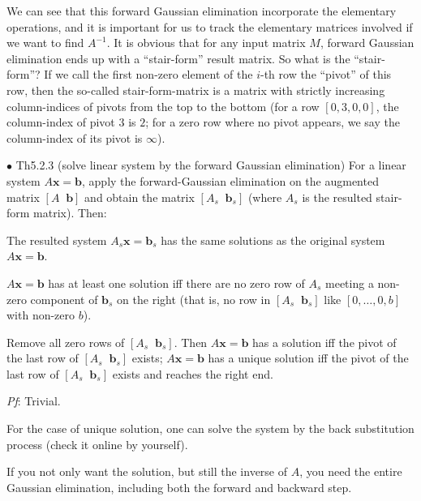 \documentclass{article}
\begin{document}
\begin{Rmk}{}
    We can see that this forward Gaussian elimination incorporate the elementary operations, and it is important for us to track the elementary matrices involved if we want to find $A^{-1}$.
    \textcolor{Th}{It is obvious that for any input matrix $M$, forward Gaussian elimination ends up with a ``stair-form'' result matrix.} So what is the ``stair-form''? \textcolor{Df}{If we call the first non-zero element of the $i$-th row the ``pivot'' of this row, then the so-called stair-form-matrix is a matrix with strictly increasing column-indices of pivots from the top to the bottom (for a row $[0,3,0,0]$, the column-index of pivot $3$ is $2$; for a zero row where no pivot appears, we say the column-index of its pivot is $\infty$).}
\end{Rmk}

\begin{Th}{$\bullet$ Th5.2.3 (solve linear system by the forward Gaussian elimination)}
    For a linear system $A\pmb{x} = \pmb{b}$, apply the forward-Gaussian elimination on the augmented matrix $[A\;\;\pmb{b}]$ and obtain the matrix $[A_s\;\; \pmb{b}_s]$ (where $A_s$ is the resulted stair-form matrix). Then:
    \begin{compactenum}
        \item The resulted system $A_s\pmb{x} = \pmb{b}_s$ has the same solutions as the original system $A\pmb{x} = \pmb{b}$.
        \item $A\pmb{x} = \pmb{b}$ has at least one solution iff there are no zero row of $A_s$ meeting a non-zero component of $\pmb{b}_s$ on the right (that is, no row in $[A_s\;\;\pmb{b}_s]$ like $[0, \dots, 0, b]$ with non-zero $b$).
        \item Remove all zero rows of $[A_s\;\;\pmb{b}_s]$. Then $A\pmb{x} = \pmb{b}$ has a solution iff the pivot of the last row of $[A_s\;\;\pmb{b}_s]$ exists; $A\pmb{x} = \pmb{b}$ has a unique solution iff the pivot of the last row of $[A_s\;\;\pmb{b}_s]$ exists and reaches the right end.
    \end{compactenum}
    \tcblower
    \textit{Pf}: Trivial.
\end{Th}

\begin{Rmk}{}
    \begin{compactitem}
        \item For the case of unique solution, one can solve the system by the back substitution process (check it online by yourself).
        \item If you not only want the solution, but still the inverse of $A$, you need the entire Gaussian elimination, including both the forward and backward step.
    \end{compactitem}
\end{Rmk}
\end{document}
